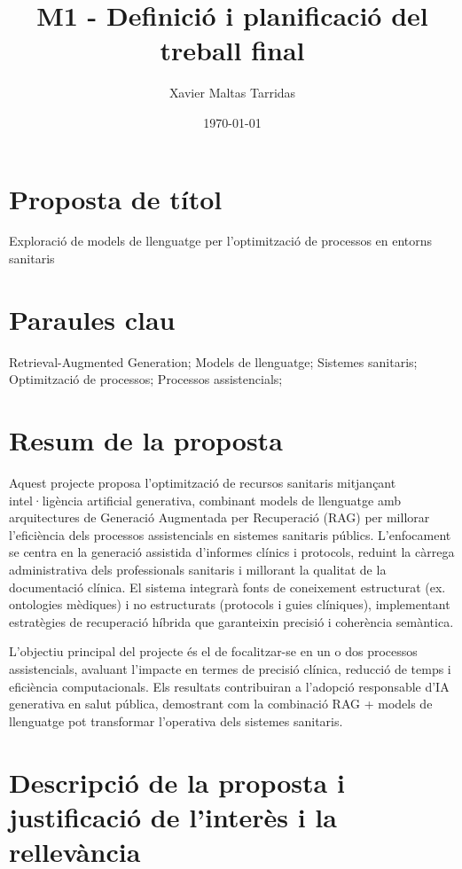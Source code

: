 \documentclass[11pt,a4paper]{article}
\title{M1 - Definició i planificació del treball final}
\author{Xavier Maltas Tarridas}
\date{\today}
\begin{document}
\maketitle

\section*{Proposta de títol}
Exploració de models de llenguatge per l'optimització de 
processos en entorns sanitaris

\section*{Paraules clau}
Retrieval-Augmented Generation; Models de llenguatge; Sistemes sanitaris; Optimització de processos; Processos assistencials;


\section*{Resum de la proposta}

Aquest projecte proposa l'optimització de recursos sanitaris mitjançant intel·ligència artificial generativa, combinant models de llenguatge amb arquitectures de Generació Augmentada per Recuperació (RAG) per millorar l'eficiència dels processos assistencials en sistemes sanitaris públics. L'enfocament se centra en la generació assistida d'informes clínics i protocols, reduint la càrrega administrativa dels professionals sanitaris i millorant la qualitat de la documentació clínica. El sistema integrarà fonts de coneixement estructurat (ex. ontologies mèdiques) i no estructurats (protocols i guies clíniques), implementant estratègies de recuperació híbrida que garanteixin precisió i coherència semàntica. 

L'objectiu principal del projecte és el de focalitzar-se en un o dos processos  assistencials, avaluant l'impacte en termes de precisió clínica, reducció de temps i eficiència computacionals. Els resultats contribuiran a l'adopció responsable d'IA generativa en salut pública, demostrant com la combinació RAG + models de llenguatge pot transformar l'operativa dels sistemes sanitaris. 




\section*{Descripció de la proposta i justificació de l'interès i la rellevància}
\end{document}

